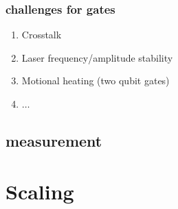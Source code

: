 \documentclass[18 pt]{beamer}
\begin{document}
\begin{frame}
  \frametitle{challenges for gates}
  \begin{enumerate}
    \item Crosstalk
    \item Laser frequency/amplitude stability
    \item Motional heating (two qubit gates)
    \item \(\dots\)
  \end{enumerate}
\end{frame}
\subsection{measurement}
\section{Scaling}
\end{document}
